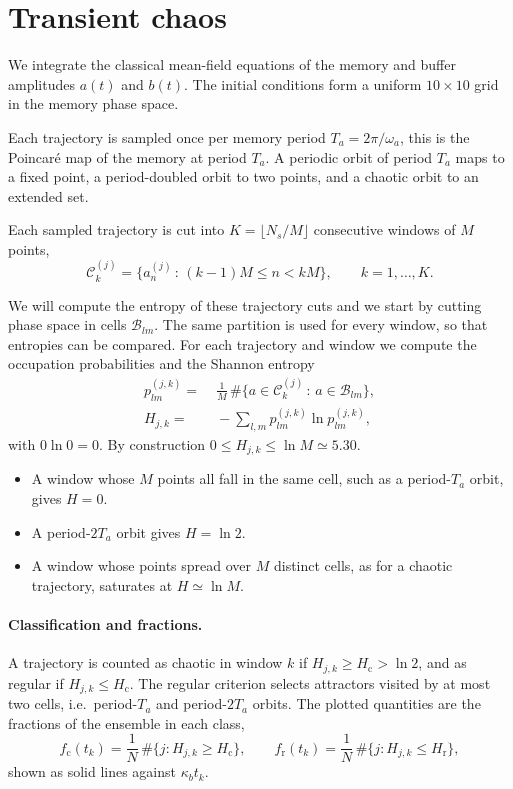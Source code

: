 \documentclass[aps,prx,reprint,floatfix,amsmath,amssymb,longbibliography]{revtex4-2}
\begin{document}
\section{Transient chaos}
\label{sec:transient_chaos}


We integrate the classical mean-field equations of the memory and buffer amplitudes $a(t)$ and $b(t)$. The initial conditions form a uniform $10\times10$ grid in the memory phase space.

Each trajectory is sampled once per memory period $T_a = 2\pi/\omega_a$,
this is the Poincaré map of the memory at period $T_a$. A periodic orbit of period $T_a$ maps to a fixed point, a period-doubled orbit to two points, and a chaotic orbit to an extended set.

Each sampled trajectory is cut into $K = \lfloor N_s/M \rfloor$ consecutive windows of $M$ points,
\begin{equation}
    \mathcal{C}^{(j)}_k = \bigl\{ a^{(j)}_n \,:\, (k-1)M \le n < kM \bigr\}, \qquad k = 1,\dots,K .
\end{equation}

We will compute the entropy of these trajectory cuts and we start by cutting phase space in cells $\mathcal{B}_{lm}$. The same partition is used for every window, so that entropies can be compared. For each trajectory and window we compute the occupation probabilities and the Shannon entropy
\begin{equation}
\begin{split}
    p^{(j,k)}_{lm} =&\; \frac{1}{M}\,\#\bigl\{ a \in \mathcal{C}^{(j)}_k \,:\, a \in \mathcal{B}_{lm} \bigr\},
    \\
    H_{j,k} =&\; -\sum_{l,m} p^{(j,k)}_{lm} \ln p^{(j,k)}_{lm},
\end{split}
\end{equation}
with $0\ln 0 = 0$. By construction $0 \le H_{j,k} \le \ln M \simeq 5.30$.
\begin{itemize}
    \item A window whose $M$ points all fall in the same cell, such as a period-$T_a$ orbit, gives $H = 0$.
    \item A period-$2T_a$ orbit gives $H = \ln 2$.
    \item A window whose points spread over $M$ distinct cells, as for a chaotic trajectory, saturates at $H \simeq \ln M$.
\end{itemize}

\paragraph*{Classification and fractions.}
A trajectory is counted as chaotic in window $k$ if $H_{j,k} \ge H_\text{c} > \ln 2$, and as regular if $H_{j,k} \le H_\text{c}$. The regular criterion selects attractors visited by at most two cells, i.e.\ period-$T_a$ and period-$2T_a$ orbits. The plotted quantities are the fractions of the ensemble in each class,
\begin{equation}
    f_\text{c}(t_k) = \frac{1}{N}\,\#\bigl\{ j : H_{j,k} \ge H_\text{c} \bigr\},
    \qquad
    f_\text{r}(t_k) = \frac{1}{N}\,\#\bigl\{ j : H_{j,k} \le H_\text{r} \bigr\},
\end{equation}
shown as solid lines against $\kappa_b t_k$.
\end{document}
